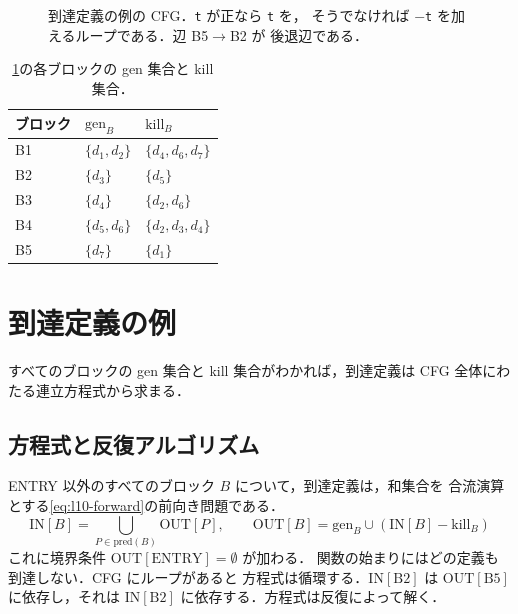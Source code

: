 \documentclass[../main.tex]{subfiles}
\begin{document}
\begin{figure}[tb]
  \centering
  
  \caption{到達定義の例の CFG．\texttt{t} が正なら \texttt{t} を，
    そうでなければ $-$\texttt{t} を加えるループである．辺 B5$\to$B2 が
    後退辺である．}
  \label{fig:l10-rd-cfg}
\end{figure}

\begin{table}[tb]
  \centering
  \small
  \caption{\cref{fig:l10-rd-cfg}の各ブロックの gen 集合と kill 集合．}
  \label{tab:l10-genkill}
  \begin{tabular}{@{}l>{\raggedright\arraybackslash}p{24mm}
                  >{\raggedright\arraybackslash}p{24mm}@{}}
    \toprule
    ブロック & $\mathrm{gen}_B$ & $\mathrm{kill}_B$ \\
    \midrule
    B1 & $\{d_1,d_2\}$ & $\{d_4,d_6,d_7\}$ \\
    B2 & $\{d_3\}$ & $\{d_5\}$ \\
    B3 & $\{d_4\}$ & $\{d_2,d_6\}$ \\
    B4 & $\{d_5,d_6\}$ & $\{d_2,d_3,d_4\}$ \\
    B5 & $\{d_7\}$ & $\{d_1\}$ \\
    \bottomrule
  \end{tabular}
\end{table}

\section{到達定義の例}
\label{sec:l10-rd-example}

すべてのブロックの gen 集合と kill 集合がわかれば，到達定義は
CFG 全体にわたる連立方程式から求まる．

\subsection{方程式と反復アルゴリズム}

ENTRY 以外のすべてのブロック $B$ について，到達定義は，和集合を
合流演算とする\cref{eq:l10-forward}の前向き問題である．
\begin{equation}
  \label{eq:l10-rd}
  \mathrm{IN}[B]=\bigcup_{P\in\mathrm{pred}(B)}\mathrm{OUT}[P],\qquad
  \mathrm{OUT}[B]=\mathrm{gen}_B\cup(\mathrm{IN}[B]-\mathrm{kill}_B)
\end{equation}
これに境界条件 $\mathrm{OUT}[\mathrm{ENTRY}]=\emptyset$ が加わる．
関数の始まりにはどの定義も到達しない．CFG にループがあると
方程式は循環する．$\mathrm{IN}[\mathrm{B2}]$ は
$\mathrm{OUT}[\mathrm{B5}]$ に依存し，それは
$\mathrm{IN}[\mathrm{B2}]$ に依存する．方程式は反復によって解く．
\end{document}
